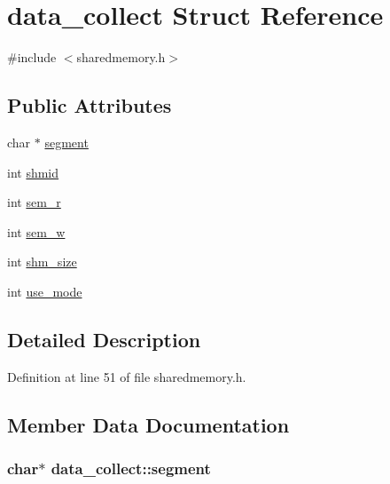 \hypertarget{structdata__collect}{
\section{data\_\-collect Struct Reference}
\label{structdata__collect}
}


{\ttfamily \#include $<$sharedmemory.h$>$}\subsection*{Public Attributes}
\begin{DoxyCompactItemize}
\item 
char $\ast$ \hyperlink{structdata__collect_aa546212afe432de623ae21ae08d91298}{segment}
\item 
int \hyperlink{structdata__collect_ac9abcd6eaee07775c435580ec3a9fca8}{shmid}
\item 
int \hyperlink{structdata__collect_adf7aaf5ee36dd36fdda6ae9fc9a4068e}{sem\_\-r}
\item 
int \hyperlink{structdata__collect_a4fa57f99fac53299a12129b6569e508a}{sem\_\-w}
\item 
int \hyperlink{structdata__collect_a7ff133294b7f36791b5fba644eeb65f0}{shm\_\-size}
\item 
int \hyperlink{structdata__collect_a68f32ef0afb09d6369f13f5f4552bf3d}{use\_\-mode}
\end{DoxyCompactItemize}


\subsection{Detailed Description}


Definition at line 51 of file sharedmemory.h.

\subsection{Member Data Documentation}
\hypertarget{structdata__collect_aa546212afe432de623ae21ae08d91298}{
\subsubsection[{segment}]{\setlength{\rightskip}{0pt plus 5cm}char$\ast$ {\bf data\_\-collect::segment}}}
\label{structdata__collect_aa546212afe432de623ae21ae08d91298}


